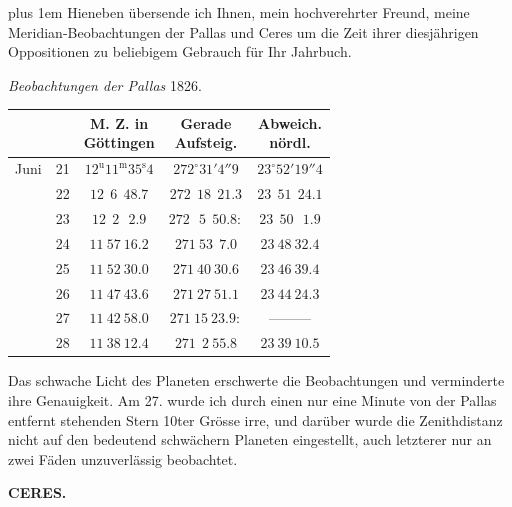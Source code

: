 \begingroup\rightskip=0pt plus 1em\relax
Hieneben übersende ich Ihnen, mein hochverehrter Freund, meine Meridian-Beobachtungen
der Pallas und Ceres um die Zeit ihrer diesjährigen Oppositionen zu beliebigem Gebrauch
für Ihr Jahrbuch.
\par\endgroup

\begin{center}
\emph{Beobachtungen der Pallas} 1826.
\end{center}

\begin{center}
\begingroup\small\setlength{\tabcolsep}{4pt}
\begin{tabular}{lr|c|c|c}
 & & \shortstack{M. Z. in\\Göttingen} & \shortstack{Gerade\\Aufsteig.} & \shortstack{Abweich.\\nördl.} \\
\hline
Juni & 21 & $12^{\mathrm u}11^{\mathrm m}35^{\mathrm s}4$ & $272^\circ 31' 4''9$ & $23^\circ 52' 19''4$ \\
 & 22 & $12\ \ 6\ \ 48.7$ & $272\ \ 18\ \ 21.3$ & $23\ \ 51\ \ 24.1$ \\
 & 23 & $12\ \ 2\ \ \ 2.9$ & $272\ \ \ 5\ \ 50.8:$ & $23\ \ 50\ \ \ 1.9$ \\
 & 24 & $11\ 57\ 16.2$ & $271\ 53\ \ 7.0$ & $23\ 48\ 32.4$ \\
 & 25 & $11\ 52\ 30.0$ & $271\ 40\ 30.6$ & $23\ 46\ 39.4$ \\
 & 26 & $11\ 47\ 43.6$ & $271\ 27\ 51.1$ & $23\ 44\ 24.3$ \\
 & 27 & $11\ 42\ 58.0$ & $271\ 15\ 23.9:$ & ---\quad---\quad--- \\
 & 28 & $11\ 38\ 12.4$ & $271\ \ 2\ 55.8$ & $23\ 39\ 10.5$ \\
\end{tabular}
\endgroup
\end{center}

Das schwache Licht des Planeten erschwerte die Beobachtungen und verminderte ihre
Genauigkeit. Am 27. wurde ich durch einen nur eine Minute von der Pallas entfernt
stehenden Stern 10ter Grösse
 irre, und darüber wurde die Zenithdistanz nicht auf den bedeutend schwächern Planeten
eingestellt, auch letzterer nur an zwei Fäden unzuverlässig beobachtet.

\clearpage
\endgroup
{}
\clearpage
\begingroup
\pagestyle{empty}
\thispagestyle{empty}
\noindent{}%
\makebox[12mm][l]{}%
\parbox[t]{\dimexpr\linewidth-24mm\relax}{\centering\footnotesize\bfseries CERES.\par}%
\par\nobreak\medskip


